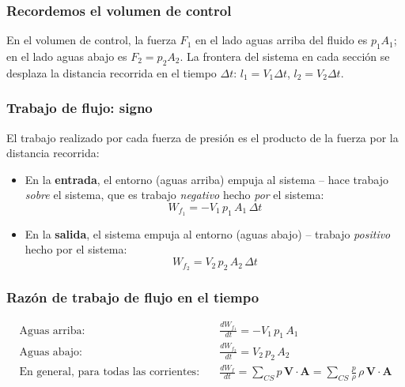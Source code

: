\documentclass{ltx-talk}
\begin{document}
\begin{frame}
  \frametitle{Recordemos el volumen de control}
  \begin{center}
  \end{center}
  En el volumen de control, la fuerza $F_1$ en el lado aguas arriba del
  fluido es $p_1 A_1$; en el lado aguas abajo es $F_2 = p_2 A_2$. La
  frontera del sistema en cada sección se desplaza la distancia
  recorrida en el tiempo $\Delta t$: $l_1 = V_1\Delta t$,
  $l_2 = V_2\Delta t$.
\end{frame}

\begin{frame}
  \frametitle{Trabajo de flujo: signo}
  El trabajo realizado por cada fuerza de presión es el producto de la
  fuerza por la distancia recorrida:
  \begin{itemize}
    \item En la \textbf{entrada}, el entorno (aguas arriba) empuja al
      sistema -- hace trabajo \emph{sobre} el sistema, que es trabajo
      \emph{negativo} hecho \emph{por} el sistema:
      \[
        W_{f_1} = -V_1\,p_1\,A_1\,\Delta t
      \]
    \item En la \textbf{salida}, el sistema empuja al entorno (aguas
      abajo) -- trabajo \emph{positivo} hecho por el sistema:
      \[
        W_{f_2} = V_2\,p_2\,A_2\,\Delta t
      \]
  \end{itemize}
\end{frame}

\begin{frame}
  \frametitle{Razón de trabajo de flujo en el tiempo}
  \begin{align*}
    \text{Aguas arriba:} \quad & \frac{dW_{f_1}}{dt} = -V_1\,p_1\,A_1 \\[0.5em]
    \text{Aguas abajo:} \quad & \frac{dW_{f_2}}{dt} = V_2\,p_2\,A_2 \\[0.5em]
    \text{En general, para todas las corrientes:} \quad
      & \frac{dW_f}{dt} = \sum_{CS} p\,\mathbf{V}\cdot\mathbf{A}
        = \sum_{CS} \frac{p}{\rho}\,\rho\,\mathbf{V}\cdot\mathbf{A}
  \end{align*}
\end{frame}
\end{document}
